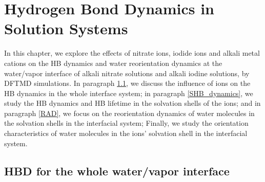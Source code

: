 \chapter{Hydrogen Bond Dynamics in Solution Systems}\label{CHAPTER_HB_SOLUTIONS}
In this chapter, we explore the effects of nitrate ions, iodide ions and alkali metal cations 
on the HB dynamics and water reorientation dynamics at the water/vapor interface of alkali nitrate solutions and alkali
iodine solutions, by DFTMD simulations. %
In paragraph \ref{HBD_ITP}, we discuss the influence of ions on the HB dynamics in the whole interface system; 
in paragraph \ref{SHB_dynamics}, we study the HB dynamics and HB lifetime in the solvation shells of the ions;
and in paragraph \ref{RAD}, we focus on the reorientation dynamics of water molecules in the solvation shells in the interfacial system; 
Finally, we study the orientation characteristics of water molecules in the ions' solvation shell in the interfacial system.

\section{HBD for the whole water/vapor interface}\label{HBD_ITP}
